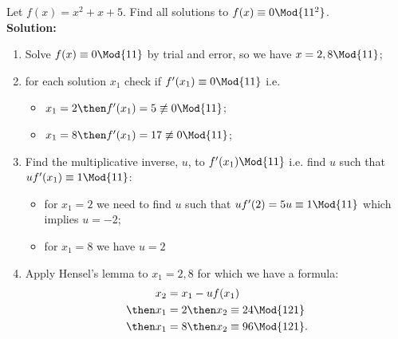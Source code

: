 \documentclass[12pt, a4paper]{article}
\begin{document}
\begin{mdexample}
    Let \(f(x)=x^2+x+5\). Find all solutions to \(f(x) \equiv 0 \Mod{11^2}\).\\
    \textbf{Solution:}
    \begin{enumerate}
        \item Solve \(f(x) \equiv 0 \Mod{11}\) by trial and error, so we have \(x=2,8 \Mod{11}\);
        \item for each solution \(x_1\) check if \(f'(x_1) \equiv 0 \Mod{11}\) i.e.
         \begin{itemize}
            \item \(x_1=2 \then f'(x_1) = 5 \not\equiv 0 \Mod{11}\);
            \item \(x_1=8 \then f'(x_1) = 17 \not\equiv 0 \Mod{11}\);
        \end{itemize}
        \item Find the multiplicative inverse, \(u\), to \(f'(x_1) \Mod{11}\) i.e. find \(u\) such that \(uf'(x_1) \equiv 1 \Mod{11}\):
            \begin{itemize}
                \item for \(x_1= 2\) we need to find \(u\) such that \(uf'(2) = 5u \equiv 1 \Mod{11}\) which implies \(u = -2\);
                \item for \(x_1 = 8\) we have \(u=2\)
            \end{itemize}
        \item Apply Hensel's lemma to \(x_1=2,8\) for which we have a formula: 
        \[\begin{aligned}
            x_2&=x_1-uf(x_1) \\
            \then x_1&=2 \then x_2 \equiv 24 \Mod{121}\\
            \then x_1 &=8 \then x_2 \equiv 96 \Mod{121}.
        \end{aligned}\]
    \end{enumerate}

    
\end{mdexample}

\end{document}
